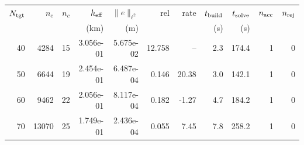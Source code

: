 \begin{tabular}{rrrrrrrrrrr}
\hline
$N_{\rm tgt}$ & $n_e$ & $n_c$ & $h_{\rm eff}$ & $\|e\|_{\ell^2}$ & rel & rate & $t_{\rm build}$ & $t_{\rm solve}$ & $n_{\rm acc}$ & $n_{\rm rej}$ \\
 & & & (km) & (m) & & & (s) & (s) & & \\
\hline
40 & 4284 & 15 & 3.056e-01 & 5.675e-02 & 12.758 & -- & 2.3 & 174.4 & 1 & 0 \\
50 & 6644 & 19 & 2.454e-01 & 6.487e-04 & 0.146 & 20.38 & 3.0 & 142.1 & 1 & 0 \\
60 & 9462 & 22 & 2.056e-01 & 8.117e-04 & 0.182 & -1.27 & 4.7 & 184.2 & 1 & 0 \\
70 & 13070 & 25 & 1.749e-01 & 2.436e-04 & 0.055 & 7.45 & 7.8 & 258.2 & 1 & 0 \\
\hline
\end{tabular}
